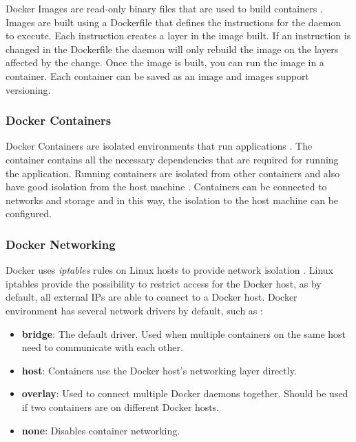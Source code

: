 \documentclass[fleqn,12pt]{olplainarticle}
\begin{document}
Docker Images are read-only binary files that are used to build containers \citep{docker:overview}. Images are built using a Dockerfile that defines the instructions for the daemon to execute. Each instruction creates a layer in the image built. If an instruction is changed in the Dockerfile the daemon will only rebuild the image on the layers affected by the change. Once the image is built, you can run the image in a container. Each container can be saved as an image and images support versioning.

\subsubsection{Docker Containers}

Docker Containers are isolated environments that run applications \citep{aquasec:docker_architecture}. The container contains all the necessary dependencies that are required for running the application. Running containers are isolated from other containers and also have good isolation from the host machine \citep{docker:security}. Containers can be connected to networks and storage and in this way, the isolation to the host machine can be configured.

\subsubsection{Docker Networking}

Docker uses \textit{iptables} rules on Linux hosts to provide network isolation \citep{docker:iptables}. Linux iptables provide the possibility to restrict access for the Docker host, as by default, all external IPs are able to connect to a Docker host. Docker environment has several network drivers by default, such as \citep{docker:network}:

\begin{itemize}
    \item \textbf{bridge}: The default driver. Used when multiple containers on the same host need to communicate with each other.
    \item \textbf{host}: Containers use the Docker host's networking layer directly.
    \item \textbf{overlay}: Used to connect multiple Docker daemons together. Should be used if two containers are on different Docker hosts.
    \item \textbf{none}: Disables container networking.  
\end{itemize}
\end{document}
